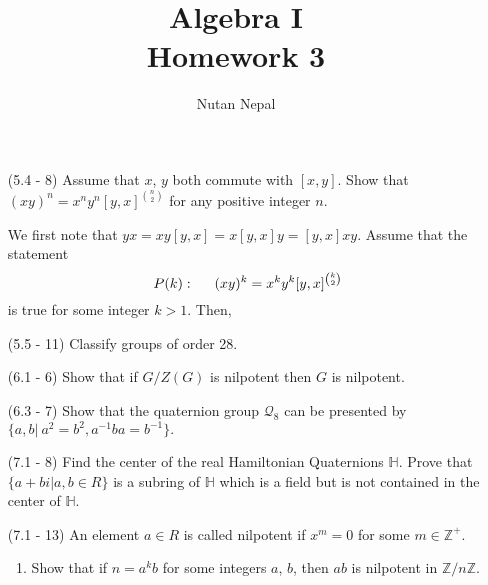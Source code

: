 \documentclass[12pt]{article}
\title{Algebra I\\
\large Homework 3
}
\author{Nutan Nepal}
\newcommand{\bz}{\mathbb{Z}}
\begin{document}
\maketitle
\makebox[\linewidth]{\rule{190mm}{.5pt}}
\vspace{0mm}
\begin{enumerate}

\item[(5.4 - 8)] Assume that $x$, $y$ both commute with
    $[x, y]$. Show that $(xy)^n = x^ny^n[y, x]^{n\choose 2}$
    for any positive integer $n$.
\begin{mybox}
    
    We first note that $yx=xy[y,x]=x[y,x]y=[y,x]xy$.
    Assume that the statement
    $$P(k):\hspace*{5mm}(xy)^k = x^ky^k[y, x]^{k\choose 2}$$
    is true for some integer $k>1$. Then,
    
\end{mybox}

\item[(5.5 - 11)] Classify groups of order 28.

\begin{mybox}

\end{mybox}


\item[(6.1 - 6)] Show that if $G/Z(G)$ is nilpotent then
    $G$ is nilpotent.

\begin{mybox}
    
\end{mybox}

\item[(6.3 - 7)] Show that the quaternion group
    $\mathcal{Q}_8$ can be presented by $\{a, b|\ a^2 =
    b^2, a^{-1}ba = b^{-1}\}.$
\begin{mybox}
    
\end{mybox}

\item[(7.1 - 8)] Find the center of the real Hamiltonian
    Quaternions $\mathbb{H}$. Prove that
    $\{a + bi|a, b\in R\}$ is a subring of $\mathbb{H}$
    which is a field but is not contained in the
    center of $\mathbb{H}$.
\begin{mybox}

\end{mybox}

\item[(7.1 - 13)] An element $a\in R$ is called
    nilpotent if $x^m = 0$ for some $m \in\mathbb{Z}^+$.
    \begin{enumerate}
        \item Show that if $n = a^kb$ for some integers
        $a$, $b$, then $ab$ is nilpotent in $\bz/n\bz$.


\end{enumerate}
\end{enumerate}
\end{document}
